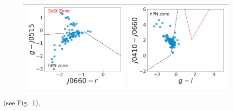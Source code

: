 \documentclass[11pt]{article}
\newcommand\raiselabel[1]{\raisebox{0.9\figwidth}[-0.5\figwidth]{#1}}
\begin{document}
\begin{figure}
\begin{tabular}{l l}
\includegraphics[width=0.5\linewidth, trim=10 10 10 10, clip]{figs-pca/Fig4-PN-pc-Halpha_emitters_threeerror-cleaning-limfilter-limcolor-flags-mask-broad-g.pdf} & \includegraphics[width=0.5\linewidth, trim=10 10 10 10, clip]{figs-pca/Fig5-PN-pc-Halpha_emitters_threeerror-cleaning-limfilter-limcolor-flags-mask-broad-gi.pdf} \\
\end{tabular}
\caption{}
\label{fig:smppne}
\end{figure}

 (see Fig.~\ref{fig:smppne}),

\newpage
\begin{longtable}{ccc}
  
\end{longtable}
\end{document}
